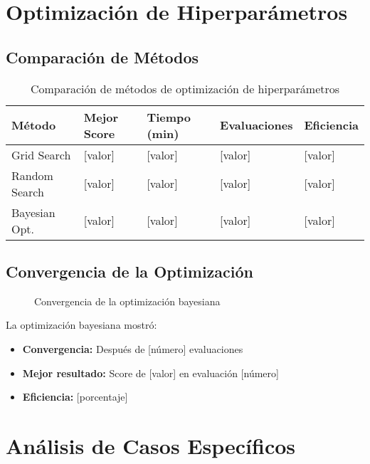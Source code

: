 \section{Optimización de Hiperparámetros}

\subsection{Comparación de Métodos}

\begin{table}[htbp]
\centering
\caption{Comparación de métodos de optimización de hiperparámetros}
\begin{tabular}{@{}p{3cm}p{2.5cm}p{2.5cm}p{3cm}p{3cm}@{}}
\toprule
\textbf{Método} & \textbf{Mejor Score} & \textbf{Tiempo (min)} & \textbf{Evaluaciones} & \textbf{Eficiencia} \\
\midrule
Grid Search & [valor] & [valor] & [valor] & [valor] \\
Random Search & [valor] & [valor] & [valor] & [valor] \\
Bayesian Opt. & [valor] & [valor] & [valor] & [valor] \\
\bottomrule
\end{tabular}
\label{tab:optimizacion_metodos}
\end{table}

\subsection{Convergencia de la Optimización}

\begin{figure}[htbp]
\centering
\caption{Convergencia de la optimización bayesiana}
\label{fig:convergencia_optimizacion}
\end{figure}

La optimización bayesiana mostró:
\begin{itemize}
    \item \textbf{Convergencia:} Después de [número] evaluaciones
    \item \textbf{Mejor resultado:} Score de [valor] en evaluación [número]
    \item \textbf{Eficiencia:} [porcentaje]%
\end{itemize}

\section{Análisis de Casos Específicos}

